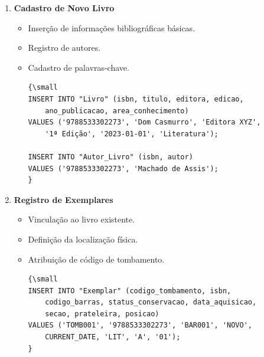 \documentclass[12pt,a4paper]{article}
\begin{document}
\begin{tcolorbox}[title=Operações de Cadastro e Atualização]
\begin{enumerate}[label=\textbf{OA\arabic*.}]
    \item \textbf{Cadastro de Novo Livro}
    \begin{itemize}
        \item Inserção de informações bibliográficas básicas.
        \item Registro de autores.
        \item Cadastro de palavras-chave.
        \begin{verbatim}
{\small
INSERT INTO "Livro" (isbn, titulo, editora, edicao,
    ano_publicacao, area_conhecimento)
VALUES ('9788533302273', 'Dom Casmurro', 'Editora XYZ',
    '1ª Edição', '2023-01-01', 'Literatura');

INSERT INTO "Autor_Livro" (isbn, autor)
VALUES ('9788533302273', 'Machado de Assis');
}
        \end{verbatim}
    \end{itemize}

    \item \textbf{Registro de Exemplares}
    \begin{itemize}
        \item Vinculação ao livro existente.
        \item Definição da localização física.
        \item Atribuição de código de tombamento.
        \begin{verbatim}
{\small
INSERT INTO "Exemplar" (codigo_tombamento, isbn,
    codigo_barras, status_conservacao, data_aquisicao,
    secao, prateleira, posicao)
VALUES ('TOMB001', '9788533302273', 'BAR001', 'NOVO',
    CURRENT_DATE, 'LIT', 'A', '01');
}
        \end{verbatim}
    \end{itemize}
\end{enumerate}
\end{tcolorbox}
\end{document}
